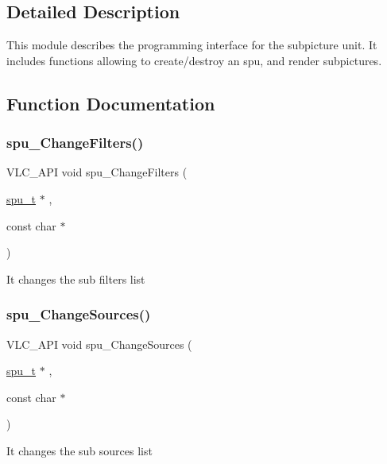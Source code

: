 \subsection{Detailed Description}
This module describes the programming interface for the subpicture unit. It includes functions allowing to create/destroy an spu, and render subpictures. 

\subsection{Function Documentation}
\mbox{\label{group__spu_gae8503a836229a6afba988668e9cbbcff}} 
\subsubsection{\texorpdfstring{spu\+\_\+\+Change\+Filters()}{spu\_ChangeFilters()}}
{\footnotesize\ttfamily V\+L\+C\+\_\+\+A\+PI void spu\+\_\+\+Change\+Filters (\begin{DoxyParamCaption}\item[{\hyperlink{structspu__t}{spu\+\_\+t} $\ast$}]{,  }\item[{const char $\ast$}]{ }\end{DoxyParamCaption})}

It changes the sub filters list \mbox{\label{group__spu_ga231064c2e066598ebcab3f97486c98f7}} 
\subsubsection{\texorpdfstring{spu\+\_\+\+Change\+Sources()}{spu\_ChangeSources()}}
{\footnotesize\ttfamily V\+L\+C\+\_\+\+A\+PI void spu\+\_\+\+Change\+Sources (\begin{DoxyParamCaption}\item[{\hyperlink{structspu__t}{spu\+\_\+t} $\ast$}]{,  }\item[{const char $\ast$}]{ }\end{DoxyParamCaption})}

It changes the sub sources list \mbox{\label{group__spu_ga01ff3c370e1b70cb0f0d560a59334e37}} 
